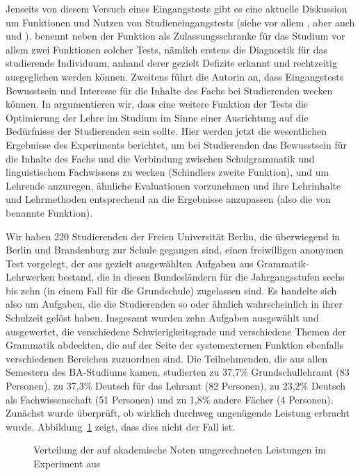 Jenseits von diesem Versuch eines Eingangstests gibt es eine aktuelle Diskussion um Funktionen und Nutzen von Studieneingangstests (siehe vor allem \citealt{Schindler2016}, aber \zB auch \citealt{Bremerichvos2016} und \citealt{FuhrhopTeuber2016}).
\citet[16]{Schindler2016} benennt neben der Funktion als Zulassungsschranke für das Studium vor allem zwei Funktionen solcher Tests, nämlich erstens die Diagnostik für das studierende Individuum, anhand derer gezielt Defizite erkannt und rechtzeitig ausgeglichen werden können.
Zweitens führt die Autorin an, dass Eingangstests Bewusstsein und Interesse für die Inhalte des Fachs bei Studierenden wecken können.
In \citet[226]{SchaeferSayatz2017a} argumentieren wir, dass eine weitere Funktion der Tests die Optimierung der Lehre im Studium im Sinne einer Ausrichtung auf die Bedürfnisse der Studierenden sein sollte.
Hier werden jetzt die wesentlichen Ergebnisse des Experiments berichtet, um bei Studierenden das Bewusstsein für die Inhalte des Fachs und die Verbindung zwischen Schulgrammatik und linguistischem Fachwissens zu wecken (Schindlers zweite Funktion), und um Lehrende anzuregen, ähnliche Evaluationen vorzunehmen und ihre Lehrinhalte und Lehrmethoden entsprechend an die Ergebnisse anzupassen (also die von \citealt{SchaeferSayatz2017a} benannte Funktion).

Wir haben 220 Studierenden der Freien Universität Berlin, die überwiegend in Berlin und Brandenburg zur Schule gegangen sind, einen freiwilligen anonymen Test vorgelegt, der aus gezielt ausgewählten Aufgaben aus Grammatik-Lehrwerken bestand, die in diesen Bundesländern für die Jahrgangsstufen sechs bis zehn (in einem Fall für die Grundschule) zugelassen sind.
Es handelte sich also um Aufgaben, die die Studierenden so oder ähnlich wahrscheinlich in ihrer Schulzeit gelöst haben.
Insgesamt wurden zehn Aufgaben ausgewählt und ausgewertet, die verschiedene Schwierigkeitsgrade und verschiedene Themen der Grammatik abdeckten, die auf der Seite der systemexternen Funktion ebenfalls verschiedenen Bereichen zuzuordnen sind.
Die Teilnehmenden, die aus allen Semestern des BA-Studiums kamen, studierten zu 37,7\% Grundschullehramt (83 Personen), zu 37,3\% Deutsch für das Lehramt (82 Personen), zu 23,2\% Deutsch als Fachwissenschaft (51 Personen) und zu 1,8\% andere Fächer (4 Personen).
Zunächst wurde überprüft, ob wirklich durchweg ungenügende Leistung erbracht wurde.
Abbildung~\ref{fig:grammatikkentnissevonstudierenden001} zeigt, dass dies nicht der Fall ist.

\begin{figure}[htpb]
  \centering
  \caption{Verteilung der auf akademische Noten umgerechneten Leistungen im Experiment aus \citet{SchaeferSayatz2017a}}
  \label{fig:grammatikkentnissevonstudierenden001}
\end{figure}


